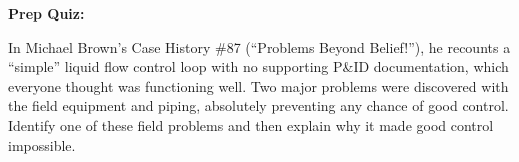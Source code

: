 \vfil \eject

\noindent
{\bf Prep Quiz:}

In Michael Brown's Case History \#87 (``Problems Beyond Belief!''), he recounts a ``simple'' liquid flow control loop with no supporting P\&ID documentation, which everyone thought was functioning well.  Two major problems were discovered with the field equipment and piping, absolutely preventing any chance of good control.  Identify one of these field problems and then explain why it made good control impossible.





